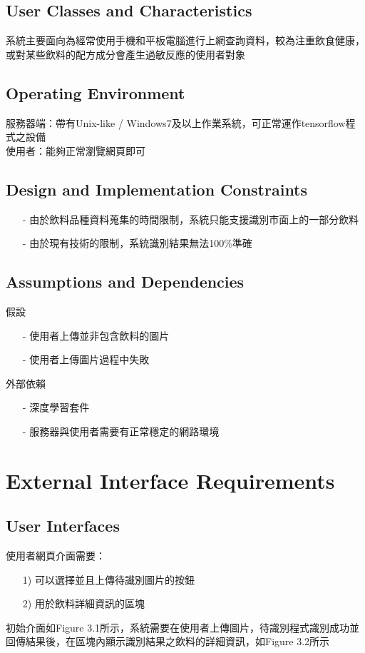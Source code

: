 \documentclass{scrreprt}
\begin{document}
\begin{CJK}{UTF8}{bkai}
\section{User Classes and Characteristics}
系統主要面向為經常使用手機和平板電腦進行上網查詢資料，較為注重飲食健康，或對某些飲料的配方成分會產生過敏反應的使用者對象

\section{Operating Environment}
服務器端：帶有Unix-like / Windows7及以上作業系統，可正常運作tensorflow程式之設備\\
使用者：能夠正常瀏覽網頁即可

\section{Design and Implementation Constraints}
\begin{itemize}
\item[-] 由於飲料品種資料蒐集的時間限制，系統只能支援識別市面上的一部分飲料
\item[-] 由於現有技術的限制，系統識別結果無法100\%準確
\end{itemize}

\section{Assumptions and Dependencies}
假設
\begin{itemize}
\item[-] 使用者上傳並非包含飲料的圖片
\item[-] 使用者上傳圖片過程中失敗
\end{itemize}
外部依賴
\begin{itemize}
\item[-] 深度學習套件
\item[-] 服務器與使用者需要有正常穩定的網路環境
\end{itemize}

\chapter{External Interface Requirements}

\section{User Interfaces}
使用者網頁介面需要：
\begin{itemize}
\item [1)]  可以選擇並且上傳待識別圖片的按鈕
\item [2)]  用於飲料詳細資訊的區塊
\end{itemize}
初始介面如Figure 3.1所示，系統需要在使用者上傳圖片，待識別程式識別成功並回傳結果後，在區塊內顯示識別結果之飲料的詳細資訊，如Figure 3.2所示


\end{CJK}
\end{document}
